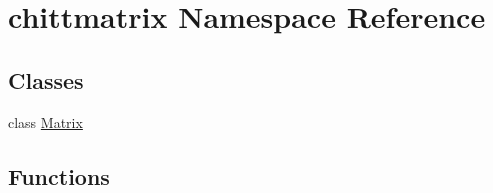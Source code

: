 \hypertarget{namespacechittmatrix}{\section{chittmatrix \-Namespace \-Reference}
\label{namespacechittmatrix}
}
\subsection*{\-Classes}
\begin{DoxyCompactItemize}
\item 
class \hyperlink{classchittmatrix_1_1Matrix}{\-Matrix}
\end{DoxyCompactItemize}
\subsection*{\-Functions}
